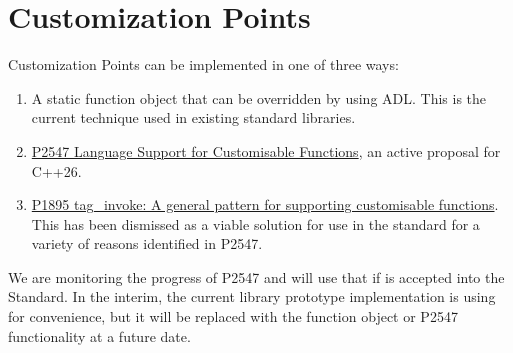 \section{Customization Points}
Customization Points can be implemented in one of three ways:
\begin{enumerate}
\item A static function object that can be overridden by using ADL. This is the current technique used in existing standard libraries.
\item \href{https://wg21.link/P2547}{P2547 Language Support for Customisable Functions}, an active proposal for C++26.
\item \href{https://www.open-std.org/jtc1/sc22/wg21/docs/papers/2019/p1895r0.pdf}{P1895 tag\_invoke: A general pattern for supporting customisable functions}. This has been dismissed as a viable solution for use in the standard for a variety of reasons identified in P2547.
\end{enumerate}

We are monitoring the progress of P2547 and will use that if is accepted into the Standard. In the interim, the current library prototype implementation is using  for convenience, but it will be replaced with the function object or P2547 functionality at a future date.
